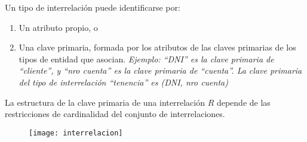 \documentclass[a4paper, twoside]{article}
\begin{document}
Un tipo de interrelación puede identificarse por:
\begin{enumerate}
	\item Un atributo propio, o
	\item Una clave primaria, formada por los atributos de las claves primarias de los tipos de entidad que asocian. \emph{Ejemplo: ``DNI'' es la clave primaria de ``cliente'', y ``nro cuenta'' es la clave primaria de ``cuenta''. La clave primaria del tipo de interrelación ``tenencia'' es (DNI, nro cuenta)}
\end{enumerate}

La estructura de la clave primaria de una interrelación $R$ depende de las restricciones de cardinalidad del conjunto de interrelaciones.

\begin{figure}[H]
	\centering
	\texttt{[image: interrelacion]}
\end{figure}
\end{document}
